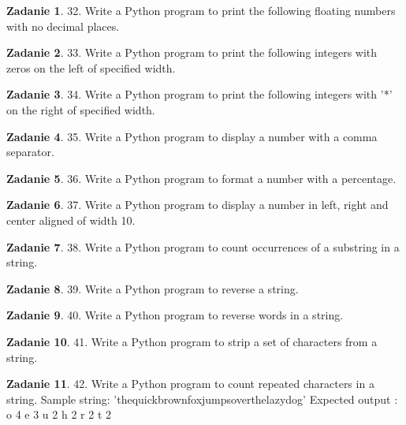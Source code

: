 \documentclass[11pt]{article}
\theoremstyle{definition}
\newtheorem{zadanie}{Zadanie}
\begin{document}
\begin{zadanie}
32. Write a Python program to print the following floating numbers with no decimal places.
\end{zadanie}

\begin{zadanie}
33. Write a Python program to print the following integers with zeros on the left of specified width.
\end{zadanie}

\begin{zadanie}
34. Write a Python program to print the following integers with '*' on the right of specified width.
\end{zadanie}

\begin{zadanie}
35. Write a Python program to display a number with a comma separator.
\end{zadanie}

\begin{zadanie}
36. Write a Python program to format a number with a percentage.
\end{zadanie}

\begin{zadanie}
37. Write a Python program to display a number in left, right and center aligned of width 10.
\end{zadanie}

\begin{zadanie}
38. Write a Python program to count occurrences of a substring in a string.
\end{zadanie}

\begin{zadanie}
39. Write a Python program to reverse a string.
\end{zadanie}

\begin{zadanie}
40. Write a Python program to reverse words in a string.
\end{zadanie}

\begin{zadanie}
41. Write a Python program to strip a set of characters from a string.
\end{zadanie}

\begin{zadanie}
42. Write a Python program to count repeated characters in a string.
Sample string: 'thequickbrownfoxjumpsoverthelazydog'
Expected output :
o 4
e 3
u 2
h 2
r 2
t 2
\end{zadanie}
\end{document}
